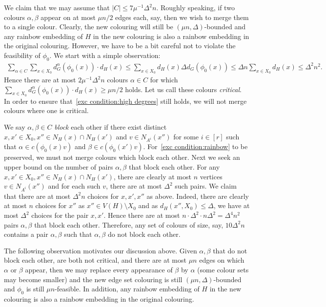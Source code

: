 \documentclass[10pt]{amsart}
\theoremstyle{definition}
\theoremstyle{claimstyle}
\theoremstyle{stepstyle}
\numberwithin{equation}{section}
\begin{document}
We claim that we may assume that $|C|\leq 7\mu^{-1}\Delta^2 n$.
Roughly speaking, if two colours $\alpha,\beta$ appear on at most $\mu n/2$ edges each, say, then we wish to merge them to a single colour.
Clearly, the new colouring will still be $(\mu n,\Delta)$-bounded and any rainbow embedding of $H$ in the new colouring is also a rainbow embedding in the original colouring. However, we have to be a bit careful not to violate the feasibility of $\phi_0$.
We start with a simple observation:
\begin{align*}
	\sum_{\alpha\in C}\sum_{x\in X_0} d^{\alpha}_G (\phi_0(x))\cdot d_H(x) \le \sum_{x\in X_0} d_H(x) \Delta d_G (\phi_0(x)) \le \Delta n \sum_{x\in X_0}  d_H(x) \leq \Delta^2 n^2.
\end{align*}
Hence there are at most $2\mu^{-1}\Delta^2 n$ colours $\alpha \in C$
for which $\sum_{x\in X_0} d^{\alpha}_G (\phi_0(x))\cdot d_H(x)\geq \mu n/2$ holds.
Let us call these colours \emph{critical}. In order to ensure that~\ref{exc condition:high degrees} still holds, we will not merge colours where one is critical.

We say $\alpha,\beta\in C$ \emph{block} each other if there exist distinct $x,x'\in X_0, x''\in N_H(x)\cap N_H(x')$ and $v\in N_{A^i}(x'')$ for some $i\in [r]$
such that $\alpha\in c(\phi_0(x)v)$ and $\beta\in c(\phi_0(x')v)$. For~\ref{exc condition:rainbow} to be preserved, we must not merge colours which block each other.
Next we seek an upper bound on the number of pairs $\alpha,\beta$ that block each other.
For any $x,x'\in X_0, x''\in N_H(x)\cap N_H(x')$,
there are clearly at most $n$ vertices $v\in N_{A^i}(x'')$
and for each such $v$, there are at most $\Delta^2$ such pairs.
We claim that there are at most $\Delta^2 n$ choices for $x,x',x''$ as above.
Indeed, there are clearly at most $n$ choices for $x''$ as $x''\in V(H)\setminus X_0$ and
as $d_H(x'',X_0)\leq \Delta$, we have at most $\Delta^2$ choices for the pair $x,x'$.
Hence there are at most $n \cdot \Delta^2 \cdot n \Delta^2=\Delta^4n^2$
pairs $\alpha,\beta$ that block each other.
Therefore, any set of colours of size, say, $10 \Delta^2 n$ contains a pair $\alpha,\beta$ such that $\alpha,\beta$ do not block each other.

The following observation motivates our discussion above.
Given $\alpha,\beta$ that do not block each other, are both not critical,
and there are at most $\mu n$ edges on which $\alpha$ or $\beta$ appear,
then we may replace every appearance of $\beta$ by $\alpha$ (some colour sets may become smaller)
and the new edge set colouring is still $(\mu n,\Delta)$-bounded and $\phi_0$ is still $\mu n$-feasible.
In addition, any rainbow embedding of $H$ in the new colouring is also a rainbow embedding in the original colouring.
\end{document}
